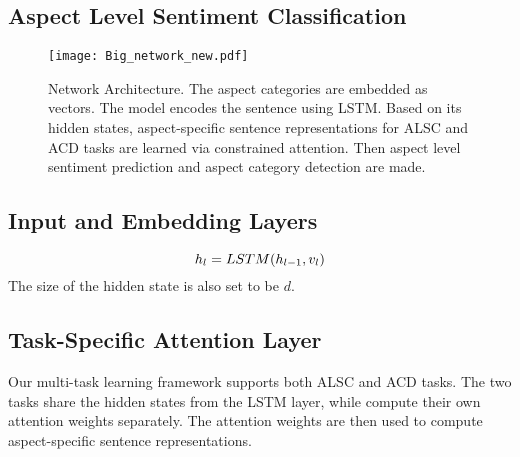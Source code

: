 \documentclass[11pt,a4paper]{article}
\begin{document}
\subsection{Aspect Level Sentiment Classification}

\begin{figure*}
\setlength{\abovecaptionskip}{0.2cm}   %
\setlength{\belowcaptionskip}{-0.3cm}   %
\centering
	\texttt{[image: Big\_network\_new.pdf]}
    \caption{Network Architecture. The aspect categories are embedded as vectors. The model encodes the sentence using LSTM. Based on its hidden states, aspect-specific sentence representations for ALSC and ACD tasks are learned via constrained attention. Then aspect level sentiment prediction and aspect category detection are made. }
    \label{network}
\end{figure*}

\subsection{Input and Embedding Layers}

\begin{equation} 
\setlength{\abovedisplayskip}{4pt}  %
\setlength{\belowdisplayskip}{4pt}  %
   h_l = LSTM(h_{l-1},v_l)
\end{equation}
The size of the hidden state is also set to be $d$.

\subsection{Task-Specific Attention Layer}
Our multi-task learning framework supports both ALSC and ACD tasks. The two tasks share the hidden states from the LSTM layer, while compute their own attention weights separately. The attention weights are then used to compute aspect-specific sentence representations. 
\end{document}
